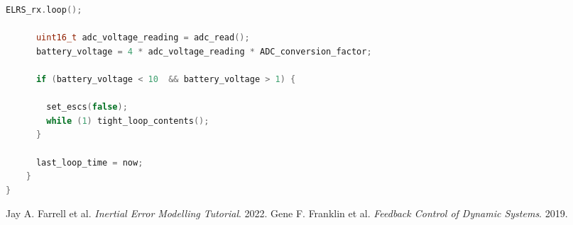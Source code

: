 \documentclass{article}
\begin{document}
\begin {lstlisting}[language=C++]
      ELRS_rx.loop();

      uint16_t adc_voltage_reading = adc_read();
      battery_voltage = 4 * adc_voltage_reading * ADC_conversion_factor;

      if (battery_voltage < 10  && battery_voltage > 1) {
        
        set_escs(false);
        while (1) tight_loop_contents();
      }

      last_loop_time = now;
    }
}
\end{lstlisting}

\begin{thebibliography}{9}
    Jay A. Farrell et al.
    \textit{Inertial Error Modelling Tutorial}.
    2022.
    Gene F. Franklin et al.
    \textit{Feedback Control of Dynamic Systems}.
    2019.
\end{thebibliography}
\end{document}
